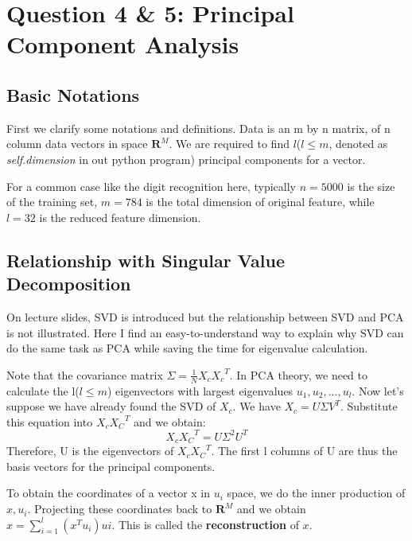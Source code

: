 \documentclass{article}
\begin{document}
\section{Question 4 \& 5: Principal Component Analysis}
\subsection{Basic Notations}
  First we clarify some notations and definitions. Data is an m by n matrix, of n column data vectors in space $\mathbf{R}^M$. 
  We are required to find $l$($l \leqslant m$, denoted as \textit{self.dimension} in out python program) principal components for a vector.\par
  For a common case like the digit recognition here, typically $n = 5000$ is the size of the training set, $m = 784$ is the total dimension of original feature, while $l = 32$ is the reduced feature dimension.
  
\subsection{Relationship with Singular Value Decomposition}
  On lecture slides, SVD is introduced but the relationship between SVD and PCA is not illustrated. Here I find an easy-to-understand way to explain why SVD can do the same task as PCA while saving the time for eigenvalue calculation.\par
  Note that the covariance matrix $\Sigma = \frac{1}{N}X_c{X_c}^T$. In PCA theory, we need to calculate the l($l \leqslant m$) eigenvectors with largest eigenvalues $u_1, u_2, ..., u_l$. Now let's suppose we have already found the SVD of $X_c$. We have $X_c = U \Sigma V^T$. Substitute this equation into $X_c {X_C}^T$ and we obtain:
  $$ X_c {X_C}^T = U \Sigma^2 U^T $$
  Therefore, U is the eigenvectors of $ X_c {X_C}^T $. The first l columns of U are thus the basis vectors for the principal components.\par
  To obtain the coordinates of a vector x in {$u_i$} space, we do the inner production of $x, u_i$. Projecting these coordinates back to $\mathbf{R}^M$ and we obtain $\hat{x} = \sum_{i = 1}^{l}(x^T u_i) ui$. This is called the \textbf{reconstruction} of $x$.
\end{document}
